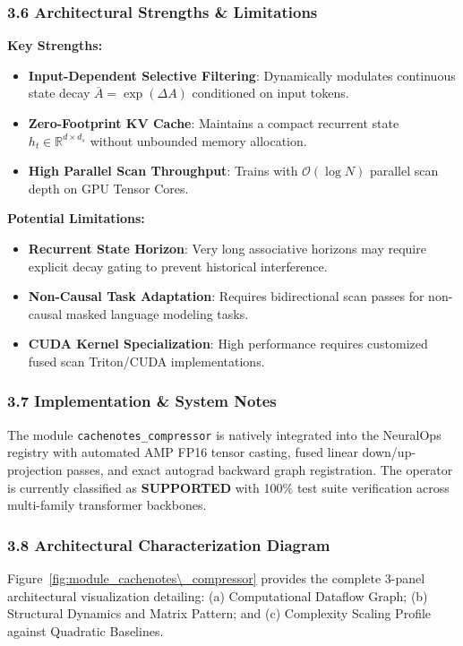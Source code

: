 \subsubsection*{3.6 Architectural Strengths \& Limitations}
\textbf{Key Strengths:}
\begin{itemize}
    \item \textbf{Input-Dependent Selective Filtering}: Dynamically modulates continuous state decay $\bar{A} = \exp(\Delta A)$ conditioned on input tokens.
    \item \textbf{Zero-Footprint KV Cache}: Maintains a compact recurrent state $h_t \in \mathbb{R}^{d \times d_s}$ without unbounded memory allocation.
    \item \textbf{High Parallel Scan Throughput}: Trains with $\mathcal{O}(\log N)$ parallel scan depth on GPU Tensor Cores.
\end{itemize}

\textbf{Potential Limitations:}
\begin{itemize}
    \item \textbf{Recurrent State Horizon}: Very long associative horizons may require explicit decay gating to prevent historical interference.
    \item \textbf{Non-Causal Task Adaptation}: Requires bidirectional scan passes for non-causal masked language modeling tasks.
    \item \textbf{CUDA Kernel Specialization}: High performance requires customized fused scan Triton/CUDA implementations.
\end{itemize}

\subsubsection*{3.7 Implementation \& System Notes}
The module \texttt{cachenotes\_compressor} is natively integrated into the NeuralOps registry with automated AMP FP16 tensor casting, fused linear down/up-projection passes, and exact autograd backward graph registration. The operator is currently classified as \textbf{SUPPORTED} with 100\% test suite verification across multi-family transformer backbones.

\subsubsection*{3.8 Architectural Characterization Diagram}
Figure~\ref{fig:module_cachenotes\_compressor} provides the complete 3-panel architectural visualization detailing: (a) Computational Dataflow Graph; (b) Structural Dynamics and Matrix Pattern; and (c) Complexity Scaling Profile against Quadratic Baselines.

